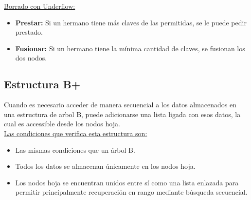 \documentclass[../main.tex]{subfiles}
\begin{document}
            \underline{Borrado con Underflow:}
            \begin{itemize}
                \item \textbf{Prestar:} Si un hermano tiene más claves de las permitidas, se le puede pedir prestado.
                \item \textbf{Fusionar:} Si un hermano tiene la mínima cantidad de claves, se fusionan los dos nodos.
            \end{itemize}

    \subsection{Estructura B+}
        Cuando es necesario acceder de manera secuencial a los datos almacenados en una estructura de arbol B, puede adicionarse una lista ligada con esos datos, la cual es accessible desde los nodos hoja.\\
        
        \underline{Las condiciones que verifica esta estructura son:}
        \begin{itemize}
            \item Las mismas condiciones que un árbol B.
            \item Todos los datos se almacenan únicamente en los nodos hoja.
            \item Los nodos hoja se encuentran unidos entre sí como una lista enlazada para permitir principalmente recuperación en rango mediante búsqueda secuencial.
        \end{itemize}
        



    
\end{document}
